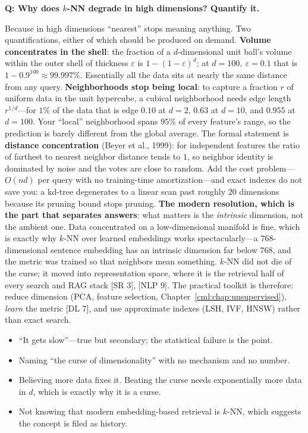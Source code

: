 \begin{interviewq}
\textbf{Q: Why does $k$-NN degrade in high dimensions? Quantify it.}

 \quad {} \quad \badgefreq{\freqmed}

\stronganswer

Because in high dimensions ``nearest'' stops meaning anything. Two quantifications, either of which should be produced on demand. \textbf{Volume concentrates in the shell}: the fraction of a $d$-dimensional unit ball's volume within the outer shell of thickness $\varepsilon$ is $1-(1-\varepsilon)^d$; at $d=100,\ \varepsilon=0.1$ that is $1-0.9^{100}\approx 99.997\%$. Essentially all the data sits at nearly the same distance from any query. \textbf{Neighborhoods stop being local}: to capture a fraction $r$ of uniform data in the unit hypercube, a cubical neighborhood needs edge length $r^{1/d}$---for $1\%$ of the data that is edge $0.10$ at $d=2$, $0.63$ at $d=10$, and $0.955$ at $d=100$. Your ``local'' neighborhood spans $95\%$ of every feature's range, so the prediction is barely different from the global average. The formal statement is \textbf{distance concentration} (Beyer et al., 1999): for independent features the ratio of farthest to nearest neighbor distance tends to $1$, so neighbor identity is dominated by noise and the votes are close to random. Add the cost problem---$O(nd)$ per query with no training-time amortization---and exact indexes do not save you: a kd-tree degenerates to a linear scan past roughly $20$ dimensions because its pruning bound stops pruning. \textbf{The modern resolution, which is the part that separates answers}: what matters is the \emph{intrinsic} dimension, not the ambient one. Data concentrated on a low-dimensional manifold is fine, which is exactly why $k$-NN over learned embeddings works spectacularly---a $768$-dimensional sentence embedding has an intrinsic dimension far below $768$, and the metric was trained so that neighbors mean something. $k$-NN did not die of the curse; it moved into representation space, where it is the retrieval half of every search and RAG stack [SR 3], [NLP 9]. The practical toolkit is therefore: reduce dimension (PCA, feature selection, Chapter~\ref{cml:chap:unsupervised}), \emph{learn} the metric [DL 7], and use approximate indexes (LSH, IVF, HNSW) rather than exact search.

\redflags
\begin{itemize}
    \item ``It gets slow''---true but secondary; the statistical failure is the point.
    \item Naming ``the curse of dimensionality'' with no mechanism and no number.
    \item Believing more data fixes it. Beating the curse needs exponentially more data in $d$, which is exactly why it is a curse.
    \item Not knowing that modern embedding-based retrieval is $k$-NN, which suggests the concept is filed as history.
\end{itemize}


\end{interviewq}
